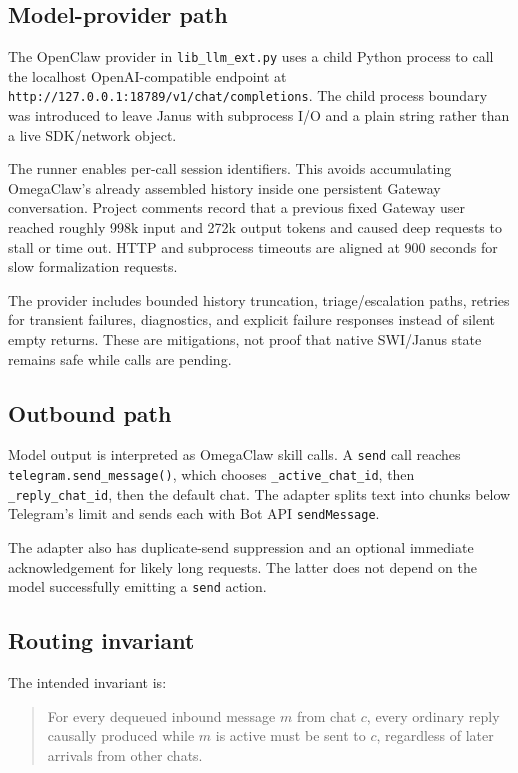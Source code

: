 \documentclass[10pt]{article}
\newcommand{\code}[1]{\texttt{#1}}
\begin{document}
\subsection{Model-provider path}

The OpenClaw provider in \code{lib\_llm\_ext.py} uses a child Python process to call the localhost OpenAI-compatible endpoint at \code{http://127.0.0.1:18789/v1/chat/completions}. The child process boundary was introduced to leave Janus with subprocess I/O and a plain string rather than a live SDK/network object.

The runner enables per-call session identifiers. This avoids accumulating OmegaClaw's already assembled history inside one persistent Gateway conversation. Project comments record that a previous fixed Gateway user reached roughly 998k input and 272k output tokens and caused deep requests to stall or time out. HTTP and subprocess timeouts are aligned at 900 seconds for slow formalization requests.

The provider includes bounded history truncation, triage/escalation paths, retries for transient failures, diagnostics, and explicit failure responses instead of silent empty returns. These are mitigations, not proof that native SWI/Janus state remains safe while calls are pending.

\subsection{Outbound path}

Model output is interpreted as OmegaClaw skill calls. A \code{send} call reaches \code{telegram.send\_message()}, which chooses \code{\_active\_chat\_id}, then \code{\_reply\_chat\_id}, then the default chat. The adapter splits text into chunks below Telegram's limit and sends each with Bot API \code{sendMessage}.

The adapter also has duplicate-send suppression and an optional immediate acknowledgement for likely long requests. The latter does not depend on the model successfully emitting a \code{send} action.

\subsection{Routing invariant}

The intended invariant is:

\begin{quote}
For every dequeued inbound message $m$ from chat $c$, every ordinary reply causally produced while $m$ is active must be sent to $c$, regardless of later arrivals from other chats.
\end{quote}
\end{document}
